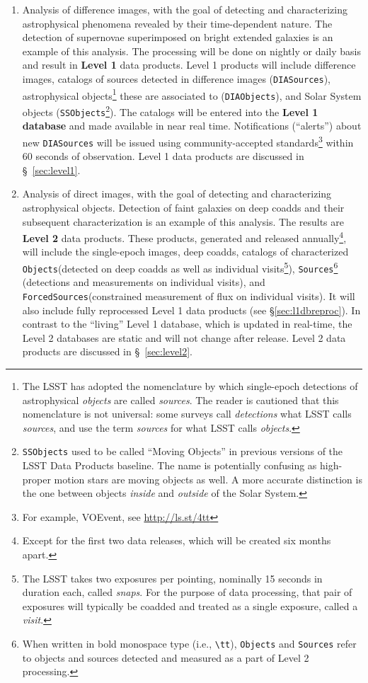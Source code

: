 \documentclass[12pt]{article}
\newcommand{\code}[1]{\texttt{#1}}
\newcommand{\DIASources}{\code{DIASources}\xspace}
\newcommand{\DIAObjects}{\code{DIAObjects}\xspace}
\newcommand{\DB}{{Level 1 database}\xspace}
\newcommand{\DR}{{Level 2 database}\xspace}
\newcommand{\Objects}{\code{Objects}\xspace}
\newcommand{\Sources}{\code{Sources}\xspace}
\newcommand{\ForcedSources}{\code{ForcedSources}\xspace}
\newcommand{\SSObjects}{\code{SSObjects}\xspace}
\begin{document}
\begin{enumerate}
\item Analysis of difference images, with the goal of detecting and characterizing astrophysical phenomena revealed by their time-dependent nature. The detection of supernovae superimposed on bright extended galaxies is an example of this analysis. The processing will be done on nightly or daily basis and result in \textbf{Level 1} data products. Level 1 products will include difference images, catalogs of sources detected in difference images (\DIASources), astrophysical objects\footnote{The LSST has adopted the nomenclature by which single-epoch detections of astrophysical \emph{objects} are called \emph{sources}. The reader is cautioned that this nomenclature is not universal: some surveys call \emph{detections} what LSST calls \emph{sources}, and use the term \emph{sources} for what LSST calls \emph{objects}.} these are associated to (\DIAObjects), and Solar System objects (\SSObjects\footnote{\SSObjects used to be called ``Moving Objects'' in previous versions of the LSST Data Products baseline. The name is potentially confusing as high-proper motion stars are moving objects as well. A more accurate distinction is the one between objects \emph{inside} and \emph{outside} of the Solar System.}). The catalogs will be entered into the \textbf{\DB} and made available in near real time. Notifications (``alerts'') about new \DIASources will be issued using community-accepted
standards\footnote{For example, VOEvent, see \url{http://ls.st/4tt}} within 60 seconds of observation. Level 1 data products are discussed in \S~\ref{sec:level1}.

\item Analysis of direct images, with the goal of detecting and characterizing astrophysical objects. Detection of faint galaxies on deep coadds and their subsequent characterization is an example of this analysis. The results are \textbf{Level 2} data products. These products, generated and released annually\footnote{Except for the first two data releases, which will be created six months apart.}, will include the single-epoch images, deep coadds, catalogs of characterized \Objects (detected on deep coadds as well as individual visits\footnote{The LSST takes two exposures per pointing, nominally 15 seconds in duration each, called \emph{snaps}. For the purpose of data processing, that pair of exposures will typically be coadded and treated as a single exposure, called a \emph{visit}.}), \Sources\footnote{When written in bold monospace type (i.e., \texttt{\textbackslash{}tt}), \Objects and \Sources refer to objects and sources detected and measured as a part of Level 2 processing.} (detections and measurements on individual visits), and \ForcedSources (constrained measurement of flux on individual visits). It will also include fully reprocessed Level 1 data products (see \S \ref{sec:l1dbreproc}). In contrast to the ``living'' \DB, which is updated in real-time, the \DR{}s are static and will not change after release. Level 2 data products are discussed in \S~\ref{sec:level2}.
\end{enumerate}
\end{document}
